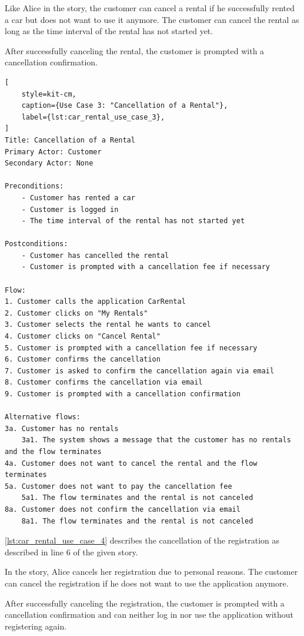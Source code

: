 Like Alice in the story, the customer can cancel a rental if he successfully rented a car but does not want to use it anymore.
The customer can cancel the rental as long as the time interval of the rental has not started yet.

After successfully canceling the rental, the customer is prompted with a cancellation confirmation.

\begin{lstlisting}[
    style=kit-cm,
    caption={Use Case 3: "Cancellation of a Rental"},
    label={lst:car_rental_use_case_3},
]
Title: Cancellation of a Rental
Primary Actor: Customer
Secondary Actor: None

Preconditions:
    - Customer has rented a car
    - Customer is logged in
    - The time interval of the rental has not started yet

Postconditions:
    - Customer has cancelled the rental
    - Customer is prompted with a cancellation fee if necessary

Flow:
1. Customer calls the application CarRental
2. Customer clicks on "My Rentals"
3. Customer selects the rental he wants to cancel
4. Customer clicks on "Cancel Rental"
5. Customer is prompted with a cancellation fee if necessary
6. Customer confirms the cancellation
7. Customer is asked to confirm the cancellation again via email
8. Customer confirms the cancellation via email
9. Customer is prompted with a cancellation confirmation

Alternative flows:
3a. Customer has no rentals
    3a1. The system shows a message that the customer has no rentals and the flow terminates
4a. Customer does not want to cancel the rental and the flow terminates
5a. Customer does not want to pay the cancellation fee
    5a1. The flow terminates and the rental is not canceled
8a. Customer does not confirm the cancellation via email
    8a1. The flow terminates and the rental is not canceled
\end{lstlisting}

\autoref{lst:car_rental_use_case_4} describes the cancellation of the registration as described in line 6 of the given story.

In the story, Alice cancels her registration due to personal reasons.
The customer can cancel the registration if he does not want to use the application anymore.

After successfully canceling the registration, the customer is prompted with a cancellation confirmation and can neither log in nor use the application without registering again.

